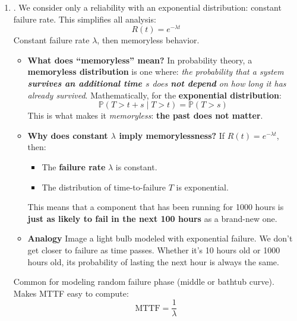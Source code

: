 \begin{enumerate}
    \item {}. We consider only a reliability with an exponential distribution: constant failure rate. This simplifies all analysis:
    \begin{equation*}
        R(t) = e^{-\lambda t}
    \end{equation*}
    Constant failure rate $\lambda$, then memoryless behavior.
    \begin{itemize}
        \item[\textcolor{Green3}{\faIcon{question-circle}}] \textcolor{Green3}{\textbf{What does ``memoryless'' mean?}} In probability theory, a \textbf{memoryless distribution} is one where: \emph{the probability that a system \textbf{survives an additional time $s$} does \textbf{not depend} on how long it has already survived}. Mathematically, for the \textbf{exponential distribution}:
        \begin{equation*}
            \mathbb{P}\left(T > t + s \mid T > t\right) = \mathbb{P}\left(T > s\right)
        \end{equation*}
        This is what makes it \emph{memoryless}: \textbf{the past does not matter}.
        \item[\textcolor{Green3}{\faIcon{question-circle}}] \textcolor{Green3}{\textbf{Why does constant $\lambda$ imply memorylessness?}} If $R(t) = e^{-\lambda t}$, then:
        \begin{itemize}
            \item The \textbf{failure rate} $\lambda$ is constant.
            \item The distribution of time-to-failure $T$ is exponential.
        \end{itemize}
        This means that a component that has been running for 1000 hours is \textbf{just as likely to fail in the next 100 hours} as a brand-new one.
        \item[\textcolor{Green3}{\faIcon{book}}] \textcolor{Green3}{\textbf{Analogy}} Image a light bulb modeled with exponential failure. We don't get closer to failure as time passes. Whether it's 10 hours old or 1000 hours old, its probability of lasting the next hour is always the same.
    \end{itemize}
    Common for modeling random failure phase (middle or bathtub curve). Makes MTTF easy to compute:
    \begin{equation}
        \text{MTTF} = \dfrac{1}{\lambda}
    \end{equation}
\end{enumerate}

